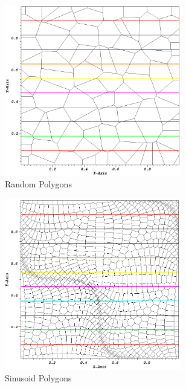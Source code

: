 \begin{figure}
\begin{subfigure}[b]{0.45\textwidth}
		\centering
		\includegraphics[width=0.85\textwidth]{figures/sec_DSA/SIP_poly_lin_contour.png}
		\caption{Random Polygons}
	\end{subfigure}
	\vfill
	\begin{subfigure}[b]{0.45\textwidth}
		\centering
		\includegraphics[width=0.85\textwidth]{figures/sec_DSA/SIP_sine_poly_lin_contour.png}
		\caption{Sinusoid Polygons}
	\end{subfigure}
	\hfill
	\begin{subfigure}[b]{0.45\textwidth}
		\centering

\end{subfigure}
\end{figure}
